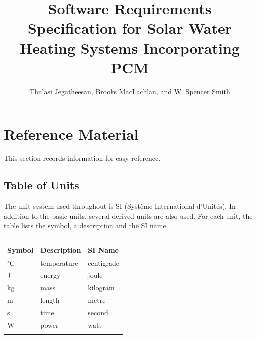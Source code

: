 \documentclass[12pt]{article}
\title{Software Requirements Specification for Solar Water Heating Systems Incorporating PCM}
\author{Thulasi Jegatheesan, Brooks MacLachlan, and W. Spencer Smith}
\begin{document}
\maketitle
\tableofcontents
\newpage
\section{Reference Material}
\label{Sec:RefMat}
This section records information for easy reference.
\subsection{Table of Units}
\label{Sec:ToU}
The unit system used throughout is SI (Système International d'Unités). In addition to the basic units, several derived units are also used. For each unit, the table lists the symbol, a description and the SI name.
\begin{longtable}{l l l}
\toprule
Symbol & Description & SI Name
\\
\midrule
\endhead
${}^{\circ}$C & temperature & centigrade
\\
J & energy & joule
\\
kg & mass & kilogram
\\
m & length & metre
\\
s & time & second
\\
W & power & watt
\\
\bottomrule
\caption{}
\label{Table:ToU}
\end{longtable}
\end{document}
